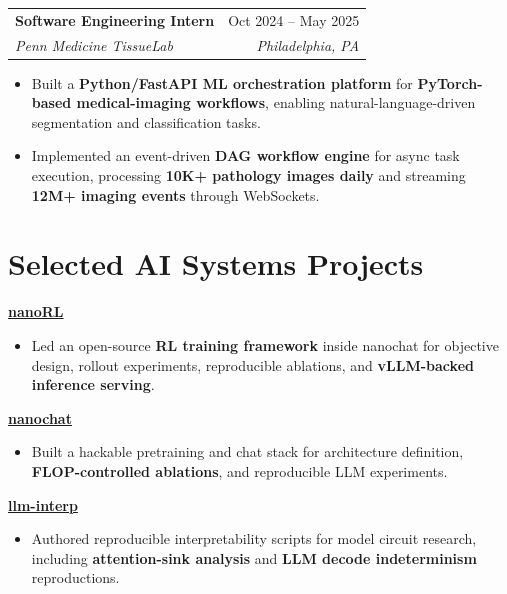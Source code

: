 \documentclass[10pt,letterpaper]{article}
\makeatletter
\newcommand{\resumeRole}[4]{
  \begin{tabular*}{\textwidth}{@{\extracolsep{\fill}} l r}
    \textbf{#1} & #2 \\
    \textit{#3} & \textit{#4}
  \end{tabular*}
}
\makeatother
\begin{document}
\resumeRole{Software Engineering Intern}{Oct 2024 -- May 2025}{Penn Medicine TissueLab}{Philadelphia, PA}
\begin{itemize}
  \item Built a \textbf{Python/FastAPI ML orchestration platform} for \textbf{PyTorch-based medical-imaging workflows}, enabling natural-language-driven segmentation and classification tasks.
  \item Implemented an event-driven \textbf{DAG workflow engine} for async task execution, processing \textbf{10K+ pathology images daily} and streaming \textbf{12M+ imaging events} through WebSockets.
\end{itemize}
\vspace{4pt}

\section*{Selected AI Systems Projects}
\href{https://github.com/RiddleHe/nanochat}{\textbf{nanoRL}}
\begin{itemize}
  \item Led an open-source \textbf{RL training framework} inside nanochat for objective design, rollout experiments, reproducible ablations, and \textbf{vLLM-backed inference serving}.
\end{itemize}
\vspace{2pt}
\href{https://github.com/RiddleHe/nanochat}{\textbf{nanochat}}
\begin{itemize}
  \item Built a hackable pretraining and chat stack for architecture definition, \textbf{FLOP-controlled ablations}, and reproducible LLM experiments.
\end{itemize}
\vspace{2pt}
\href{https://github.com/RiddleHe/llm-interp}{\textbf{llm-interp}}
\begin{itemize}
  \item Authored reproducible interpretability scripts for model circuit research, including \textbf{attention-sink analysis} and \textbf{LLM decode indeterminism} reproductions.
\end{itemize}
\end{document}
